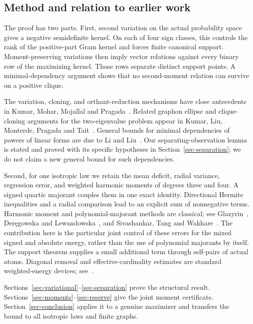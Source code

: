 \documentclass[11pt]{article}
\theoremstyle{remark}\newtheorem{remark}[theorem]{Remark}
\numberwithin{equation}{section}
\begin{document}
\subsection{Method and relation to earlier work}
The proof has two parts. First, second variation on the actual probability
space gives a negative semidefinite kernel. On each of four sign classes,
this controls the rank of the positive-part Gram kernel and forces finite
canonical support. Moment-preserving variations then imply vector
relations against every binary row of the maximizing kernel. Those rows
separate distinct support points. A minimal-dependency argument shows
that no second-moment relation can survive on a positive clique.

The variation, cloning, and orthant-reduction mechanisms have close
antecedents in Kumar, Mohar, Mojallal and Pragada~\cite{KMMP}. Related graphon
ellipse and clique-cloning arguments for the two-eigenvalue problem
appear in Kumar, Liu, Monterde, Pragada and Tait~\cite{KLMPT}. General
bounds for minimal dependencies of powers of linear forms are due to
Li and Liu~\cite{LiLiu}. Our separating-observation lemma is stated and
proved with its specific hypotheses in Section~\ref{sec-separation};
we do not claim a new general bound for such dependencies.

Second, for one isotropic law we retain the mean deficit, radial variance,
regression error, and weighted harmonic moments of degrees three and four.
A signed quartic majorant couples them in one exact identity. Directional
Hermite inequalities and a radial comparison lead to an explicit sum of
nonnegative terms. Harmonic moment and polynomial-majorant methods are
classical; see Glazyrin~\cite{Glazyrin}, Der\k{e}gowska and
Lewandowska~\cite{DL,DL-SW}, and Sivashankar, Tang and Wakhare~\cite{STW}.
The contribution here is the particular joint control of these errors
for the mixed signed and absolute energy, rather than the use of
polynomial majorants by itself. The support theorem supplies a small
additional term through self-pairs of actual atoms. Diagonal removal and
effective-cardinality estimates are standard weighted-energy devices;
see~\cite{Weighted}.

Sections~\ref{sec-variational}--\ref{sec-separation} prove the structural
result. Sections~\ref{sec-moments}--\ref{sec-reserve} give the joint
moment certificate. Section~\ref{sec-conclusion} applies it to a genuine
maximizer and transfers the bound to all isotropic laws and finite graphs.
\end{document}
